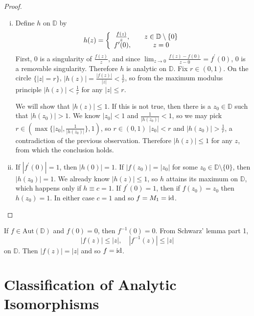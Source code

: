\begin{proof}

\begin{enumerate}[(i)]
  \item{
    Define $h$ on $\mathbb{D}$ by
    $$
      h(z)
    = \left\{
        \begin{array}{c c}
          \frac{f(z)}{z}, & \quad z \in \mathbb{D} \setminus \{ 0 \} \\
          f^\prime(0),     & \quad z = 0
        \end{array}\right.
    $$
    First, $0$ is a singularity of $\frac{f(z)}{z}$, and since
    $\lim_{z \to 0} \frac{f(z) - f(0)}{z - 0} = f^\prime(0)$, $0$ is a
    removable singularity. Therefore $h$ is analytic on $\mathbb{D}$.
    Fix $r \in (0, 1)$. On the circle $\{|z| = r\}$,
    $|h(z)| = \frac{|f(z)|}{|z|} < \frac{1}{r}$, so from the maximum
    modulus principle $|h(z)| < \frac{1}{r}$ for any $|z| \leq r$.

    We will show that $|h(z)| \leq 1$. If this is not true, then
    there is a $z_0 \in \mathbb{D}$ such that $|h(z_0)| > 1$.
    We know $|z_0| < 1$ and $\frac{1}{|h(z_0)|} < 1$, so we may pick
    $r \in (\max \{ |z_0|, \frac{1}{|h(z_0)|} \}, 1)$, so $r \in(0, 1)$
    $|z_0| < r$ and $|h(z_0)| > \frac{1}{r}$, a contradiction of the
    previous observation. Therefore $|h(z)| \leq 1$ for any $z$, from
    which the conclusion holds.
  }
  \item{
    If $|f^\prime(0)| = 1$, then $|h(0)| = 1$.
    If $|f(z_0)| = |z_0|$ for some
    $z_0 \in \mathbb{D} \setminus \{ 0 \}$,
    then $|h(z_0)| = 1$. We already know $|h(z)| \leq 1$,
    so $h$ attains its maximum on $\mathbb{D}$, which happens
    only if $h \equiv c = 1$. If $f^\prime(0) = 1$, then if
    $f(z_0) = z_0$ then $h(z_0) = 1$. In either case $c = 1$ and so
    $f = M_1 = \mathrm{id}$.
  }
\end{enumerate}
\end{proof}

\begin{remark}
If $f \in \mathrm{Aut}(\mathbb{D})$ and $f(0) = 0$, then
$f^{-1}(0) = 0$. From Schwarz' lemma part 1,
$$
|f(z)| \leq |z|, \quad |f^{-1}(z)| \leq |z|
$$
on $\mathbb{D}$. Then $|f(z)| = |z|$ and so $f = \mathrm{id}$.
\end{remark}

\section{Classification of Analytic Isomorphisms}
